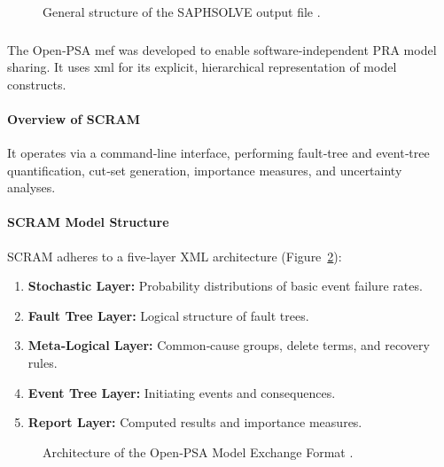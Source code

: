 \begin{figure}[htbp]
  \centering
  \caption{General structure of the SAPHSOLVE output file \cite{15}.}
  \label{fig:saphsolve_output}
\end{figure}

\subsubsection{\color{yellow}{Open‑PSA Model Exchange Framework}}
\label{sec:openpsa_mef}

The Open‑PSA \acrshort{mef} \cite{36} was developed to enable software‑independent PRA model sharing. It uses \acrshort{xml} for its explicit, hierarchical representation of model constructs.

\paragraph{Overview of SCRAM}
It operates via a command‑line interface, performing fault‑tree and event‑tree quantification, cut‑set generation, importance measures, and uncertainty analyses.

\paragraph{SCRAM Model Structure}
SCRAM adheres to a five‑layer XML architecture (Figure~\ref{fig:openpsa_arch}):
\begin{enumerate}
  \item \textbf{Stochastic Layer:} Probability distributions of basic event failure rates.
  \item \textbf{Fault Tree Layer:} Logical structure of fault trees.
  \item \textbf{Meta‑Logical Layer:} Common‑cause groups, delete terms, and recovery rules.
  \item \textbf{Event Tree Layer:} Initiating events and consequences.
  \item \textbf{Report Layer:} Computed results and importance measures.
\end{enumerate}

\begin{figure}[htbp]
  \centering
  \caption{Architecture of the Open‑PSA Model Exchange Format \cite{36}.}
  \label{fig:openpsa_arch}
\end{figure}